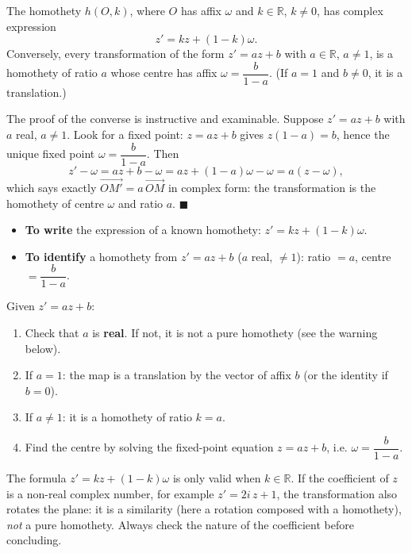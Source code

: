 \documentclass[11pt]{article}
\newcommand{\cle}[1]{{\popxbold\color{popdark}#1}}
\begin{document}
\begin{propriete}
The homothety $h(O,k)$, where $O$ has affix $\omega$ and $k \in \mathbb{R}$, $k \neq 0$, has complex expression
\[ z' = kz + (1-k)\omega. \]
Conversely, every transformation of the form $z' = az + b$ with $a \in \mathbb{R}$, $a \neq 1$, is a homothety of ratio $a$ whose centre has affix $\omega = \dfrac{b}{1-a}$. (If $a = 1$ and $b \neq 0$, it is a translation.)
\end{propriete}

The proof of the converse is instructive and examinable. Suppose $z' = az + b$ with $a$ real, $a \neq 1$. Look for a fixed point: $z = az + b$ gives $z(1-a) = b$, hence the unique fixed point $\omega = \dfrac{b}{1-a}$. Then
\[ z' - \omega = az + b - \omega = az + (1-a)\omega - \omega = a(z - \omega), \]
which says exactly $\vec{OM'} = a\,\vec{OM}$ in complex form: the transformation is the homothety of centre $\omega$ and ratio $a$. $\blacksquare$

\begin{aretenir}
\begin{itemize}
\item \textbf{To write} the expression of a known homothety: $z' = kz + (1-k)\omega$.
\item \textbf{To identify} a homothety from $z' = az + b$ ($a$ real, $\neq 1$): ratio $= a$, centre $= \dfrac{b}{1-a}$.
\end{itemize}
\end{aretenir}

\begin{methode}
Given $z' = az + b$:
\begin{enumerate}
\item Check that $a$ is \textbf{real}. If not, it is not a pure homothety (see the warning below).
\item If $a = 1$: the map is a translation by the vector of affix $b$ (or the identity if $b = 0$).
\item If $a \neq 1$: it is a homothety of ratio $k = a$.
\item Find the centre by solving the fixed-point equation $z = az + b$, i.e. $\omega = \dfrac{b}{1-a}$.
\end{enumerate}
\end{methode}

\begin{attention}
The formula $z' = kz + (1-k)\omega$ is only valid when $k \in \mathbb{R}$. If the coefficient of $z$ is a non-real complex number, for example $z' = 2i\,z + 1$, the transformation also rotates the plane: it is a \cle{similarity} (here a rotation composed with a homothety), \emph{not} a pure homothety. Always check the nature of the coefficient before concluding.
\end{attention}
\end{document}
